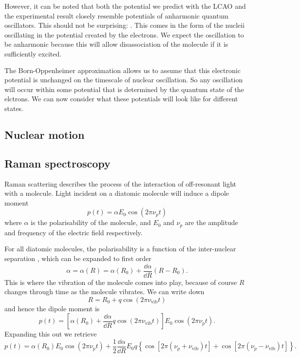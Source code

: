 However, it can be noted that both the potential we predict with the LCAO and
the experimental result closely resemble potentials of anharmonic quantum
oscillators. This should not be surprising: . This comes in the form of the
nucleii oscillating in the potential created by the electrons.  We expect the oscillation to be anharmonic
because this will allow disassociation of the molecule if it is sufficiently
excited.

The Born-Oppenheimer approximation allows us to assume that this electronic
potential is unchanged on the timescale of nuclear oscillation. So any
oscillation will occur within some potential that is determined by the quantum
state of the elctrons. We can now consider what these potentials will look like
for different states.

%

\subsection{Nuclear motion}

\subsection{Raman spectroscopy}

Raman scattering describes the process of the interaction of off-resonant light
with a molecule.  Light incident on a diatomic molecule will induce a dipole
moment
%
\begin{equation}
  p(t) = \alpha E_0 \cos(2\pi\nu_p t)
\end{equation}
%
where $\alpha$ is the polarisability of the molecule, and $E_0$ and $\nu_p$ are
the amplitude and frequency of the electric field respectively.

For all diatomic molecules, the polarisability is a function of the
inter-nuclear separation \cite{}, which can be expanded to first order
%
\begin{equation}
\alpha = \alpha(R) = \alpha(R_0) + \frac{\dd \alpha}{\dd R}(R - R_0).
\end{equation}
%
This is where the vibration of the molecule comes into play, because of course
$R$ changes through time as the molecule vibrates. We can write down
%
\begin{equation}
R = R_0 + q \cos (2\pi \nu_\text{vib} t)
\end{equation}
and hence the dipole moment is
\begin{equation}
p(t) = \left[ \alpha(R_0) + \frac{\dd \alpha}{\dd R} q\cos (2\pi\nu_\text{vib}t)
\right] E_0 \cos(2\pi\nu_p t).
\end{equation}
Expanding this out we retrieve
\begin{equation}
p(t) = \alpha(R_0)E_0\cos(2\pi\nu_p t) + \frac{1}{2}\frac{\dd \alpha}{\dd R}
E_0 q \left\{ \cos\left[ 2\pi(\nu_p + \nu_\text{vib})t\right]
+ \cos\left[ 2\pi(\nu_p - \nu_\text{vib})t\right] \right\}.
\end{equation}

